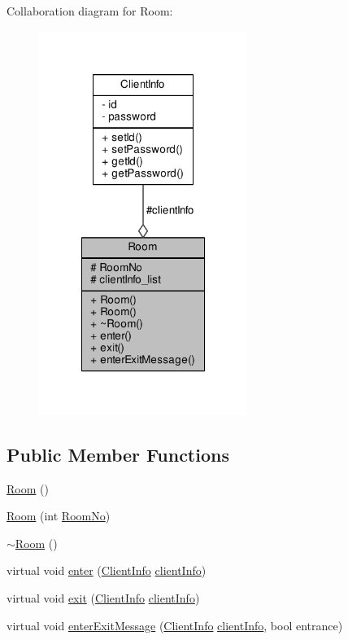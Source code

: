 Collaboration diagram for Room\+:
\nopagebreak
\begin{figure}[H]
\begin{center}
\leavevmode
\includegraphics[width=192pt]{class_room__coll__graph}
\end{center}
\end{figure}
\subsection*{Public Member Functions}
\begin{DoxyCompactItemize}
\item 
\hyperlink{class_room_ac6ef93a7d9c3e1d624e025058d5f16ff}{Room} ()
\item 
\hyperlink{class_room_a346d7bf9067260cceec4aa74ba5d4959}{Room} (int \hyperlink{class_room_a7b2baed8e22a938246e54984cf396b47}{Room\+No})
\item 
\hyperlink{class_room_a67d5da09983cc53097807fd43ba5481a}{$\sim$\+Room} ()
\item 
virtual void \hyperlink{class_room_af6369792216d4f6d8dc14c27fbe8218b}{enter} (\hyperlink{class_client_info}{Client\+Info} \hyperlink{class_room_a4dd1160fe55a497f7349488d934b1805}{client\+Info})
\item 
virtual void \hyperlink{class_room_a85bb6bc37f4caff36854e38cf659df62}{exit} (\hyperlink{class_client_info}{Client\+Info} \hyperlink{class_room_a4dd1160fe55a497f7349488d934b1805}{client\+Info})
\item 
virtual void \hyperlink{class_room_a463a61c145c7609cfc3433cb201ad71f}{enter\+Exit\+Message} (\hyperlink{class_client_info}{Client\+Info} \hyperlink{class_room_a4dd1160fe55a497f7349488d934b1805}{client\+Info}, bool entrance)
\end{DoxyCompactItemize}
